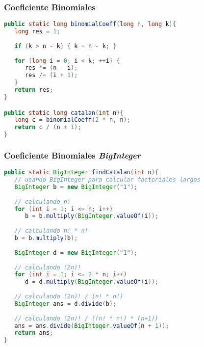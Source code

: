 \subsubsection{Coeficiente Binomiales}
\begin{lstlisting}[language=Java]
public static long binomialCoeff(long n, long k){
   long res = 1;
	
   if (k > n - k) { k = n - k; }
	
   for (long i = 0; i < k; ++i) {
      res *= (n - i);
      res /= (i + 1);
   }
   return res;
}

public static long catalan(int n){
   long c = binomialCoeff(2 * n, n);
   return c / (n + 1);
}
\end{lstlisting}

\subsubsection{Coeficiente Binomiales \emph{BigInteger}}
\begin{lstlisting}[language=Java]
public static BigInteger findCatalan(int n){
   // usando BigInteger para calcular factoriales largos
   BigInteger b = new BigInteger("1");
	
   // calculando n!
   for (int i = 1; i <= n; i++) 
      b = b.multiply(BigInteger.valueOf(i));
   
   // calculando n! * n!
   b = b.multiply(b);
	
   BigInteger d = new BigInteger("1");
	
   // calculando (2n)!
   for (int i = 1; i <= 2 * n; i++)
      d = d.multiply(BigInteger.valueOf(i));
   
   // calculando (2n)! / (n! * n!)
   BigInteger ans = d.divide(b);
	
   // calculando (2n)! / ((n! * n!) * (n+1))
   ans = ans.divide(BigInteger.valueOf(n + 1));
   return ans;
}
\end{lstlisting}
